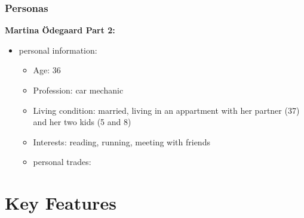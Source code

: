 \documentclass[aspectratio=169]{beamer}
\begin{document}
\begin{frame}   
	\frametitle{Personas}{\textbf{Martina Ödegaard Part 2:}}

\begin{itemize}
	\item personal information:
	\begin{itemize}
		\item Age: 36
		\item Profession: car mechanic
		\item Living condition: married, living in an appartment with her partner (37) and her two kids (5 and 8)
		\item Interests: reading, running, meeting with friends
		\item personal trades:
	\end{itemize}

\end{itemize}

\end{frame}

\section{Key Features}


\end{document}
